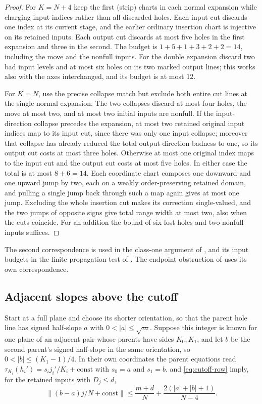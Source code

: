 \documentclass[11pt,colorlinks]{charlie}
\newcommand{\norm}[1]{\lVert #1\rVert}
\begin{document}
\begin{proof}
For $K=N+4$ keep the first (strip) charts in each normal expansion while charging input indices rather than all discarded holes. Each input cut discards one index at its current stage, and the earlier ordinary insertion chart is injective on its retained inputs. Each output cut discards at most five holes in the first expansion and three in the second. The budget is $1+5+1+3+2+2=14$, including the move and the nonfull inputs. For the double expansion discard two bad input levels and at most six holes on its two marked output lines; this works also with the axes interchanged, and its budget is at most $12$.

For $K=N$, use the precise collapse match but exclude both entire cut lines at the single normal expansion. The two collapses discard at most four holes, the move at most two, and at most two initial inputs are nonfull. If the input-direction collapse precedes the expansion, at most two retained original input indices map to its input cut, since there was only one input collapse; moreover that collapse has already reduced the total output-direction badness to one, so its output cut costs at most three holes. Otherwise at most one original index maps to the input cut and the output cut costs at most five holes. In either case the total is at most $8+6=14$. Each coordinate chart composes one downward and one upward jump by two, each on a weakly order-preserving retained domain, and pulling a single jump back through such a map again gives at most one jump. Excluding the whole insertion cut makes its correction single-valued, and the two jumps of opposite signs give total range width at most two, also when the cuts coincide. For an addition the bound of six lost holes and two nonfull inputs suffices.
\end{proof}

The second correspondence is used in the class-one argument of , and its input budgets in the finite propagation test of . The endpoint obstruction of  uses its own correspondence.

\subsection{Adjacent slopes above the cutoff}
Start at a full plane and choose its shorter orientation, so that the parent hole line has signed half-slope $a$ with $0<|a|\le\sqrt m$. Suppose this integer is known for one plane of an adjacent pair whose parents have sides $K_0,K_1$, and let $b$ be the second parent's signed half-slope in the same orientation, so $0<|b|\le(K_1-1)/4$. In their own coordinates the parent equations read $\tau_{K_i}(h_i')=s_ij_i'/K_i+\mathrm{const}$ with $s_0=a$ and $s_1=b$.  and \eqref{eq:cutoff-row} imply, for the retained inputs with $D_j\le d$,
\begin{equation}\label{eq:cutoff-global}
 \norm{(b-a)j/N+\mathrm{const}}\le\frac{m+d}{N}+\frac{2(|a|+|b|+1)}{N-4}.
\end{equation}
\end{document}
